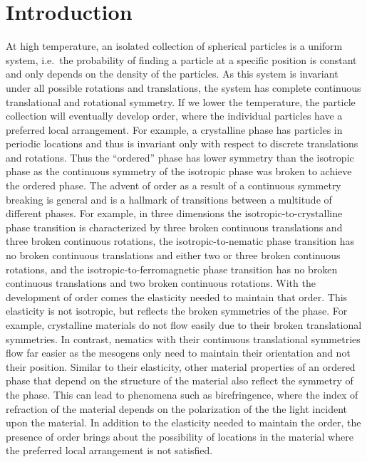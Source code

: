 \chapter{Introduction}
At high temperature, an isolated collection of spherical particles is a uniform system, i.e.\ the probability of finding a particle at a specific position is constant and only depends on the density of the particles.
As this system is invariant under all possible rotations and translations, the system has complete continuous translational and rotational symmetry.
If we lower the temperature, the particle collection will eventually develop order, where the individual particles have a preferred local arrangement.
For example, a crystalline phase has particles in periodic locations and thus is invariant only with respect to discrete translations and rotations.
Thus the ``ordered'' phase has lower symmetry than the isotropic phase as the continuous symmetry of the isotropic phase was broken to achieve the ordered phase.
The advent of order as a result of a continuous symmetry breaking is general and is a hallmark of transitions between a multitude of different phases. For example, in three dimensions the isotropic-to-crystalline phase transition is characterized by three broken continuous translations and three broken continuous rotations, the isotropic-to-nematic phase transition has no broken continuous translations and either two or three broken continuous rotations, and the isotropic-to-ferromagnetic phase transition has no broken continuous translations and two broken continuous rotations.
With the development of order comes the elasticity needed to maintain that order.
This elasticity is not isotropic, but reflects the broken symmetries of the phase.
For example, crystalline materials do not flow easily due to their broken translational symmetries.
In contrast, nematics with their continuous translational symmetries flow far easier as the mesogens only need to maintain their orientation and not their position.
Similar to their elasticity, other material properties of an ordered phase that depend on the structure of the material also reflect the symmetry of the phase.
This can lead to phenomena such as birefringence, where the index of refraction of the material depends on the polarization of the the light incident upon the material.
In addition to the elasticity needed to maintain the order, the presence of order brings about the possibility of locations in the material where the preferred local arrangement is not satisfied.
